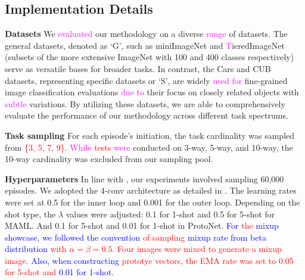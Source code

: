 \documentclass[letterpaper]{article} %
\newcommand{\nj}[1]{\textcolor{red}{#1}}
\newcommand{\jh}[1]{\textcolor{blue}{#1}}
\newcommand{\yr}[1]{\textcolor{magenta}{#1}}
\begin{document}
\subsection{Implementation Details}
\textbf{Datasets} We \yr{evaluated} our methodology on a diverse \yr{range} of datasets. The general datasets, denoted as `G', such as miniImageNet \cite{dataset:miniImageNet} and \yr{T}ieredImageNet \cite{dataset:tieredimagenet} (subsets of the more extensive ImageNet \cite{dataset:imagenet} with 100 and 400 classes respectively) serve as versatile bases for broader tasks. In contrast, the Cars \cite{dataset:cars} and CUB \cite{dataset:cub} datasets, representing specific datasets or `S', are widely \yr{used for} fine-grained image classification evaluations \yr{due to} their focus on closely related objects with \yr{subtle} variations. 
By utilizing these datasets, we are able to comprehensively evaluate the performance of our methodology across different task spectrums. %

\textbf{Task sampling} For each episode's initiation, the task cardinality was sampled from \nj{\{3, 5, 7, 9\}}. \yr{While \nj{tests} were} %
conducted on 3-way, 5-way, and 10-way, the 10-way cardinality was excluded from our sampling pool.

\textbf{Hyperparameters} In line with \cite{episodic:GBML:BOIL}, our experiments involved sampling 60,000 episodes. We adopted the 4-conv architecture as detailed in \cite{dataset:miniImageNet}. The learning rates were set at 0.5 for the inner loop and 0.001 for the outer loop. Depending on the shot type, the $\lambda$ values were adjusted: 0.1 for 1-shot and 0.5 for 5-shot for MAML. And 0.1 for 5-shot and 0.01 for 1-shot in ProtoNet. \jh{For \nj{the} mixup showcase, we followed the convention \nj{of sampling} mixup rate from beta distribution \nj{with $\alpha = \beta = 0.5$.}  %
\nj{Four images were mixed to generate a mixup image.} Also, when constructing \nj{prototye vectors, the EMA rate was set to 0.05 for 5-shot and} 0.01 for 1-shot.}
\end{document}
